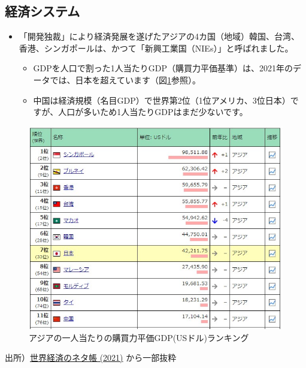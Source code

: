 \documentclass[
]{book}
\begin{document}
\hypertarget{asia-economy}{%
\subsection{経済システム}\label{asia-economy}}

\begin{itemize}
\item
  「開発独裁」により経済発展を遂げたアジアの4カ国（地域）韓国、台湾、香港、シンガポールは、かつて「新興工業国（NIEs）」と呼ばれました。

  \begin{itemize}
  \item
    GDPを人口で割った1人当たりGDP（購買力平価基準）は、2021年のデータでは、日本を超えています（図\ref{fig:percapita}参照）。
  \item
    中国は経済規模（名目GDP）で世界第2位（1位アメリカ、3位日本）ですが、人口が多いため1人当たりGDPはまだ少ないです。
  \end{itemize}
\end{itemize}

\begin{figure}
\includegraphics[width=480px]{percapita} \caption{アジアの一人当たりの購買力平価GDP(USドル)ランキング}\label{fig:percapita}
\end{figure}

出所）\href{https://ecodb.net/ranking/area/A/imf_ppppc.html}{世界経済のネタ帳 (2021)} から一部抜粋
\end{document}
